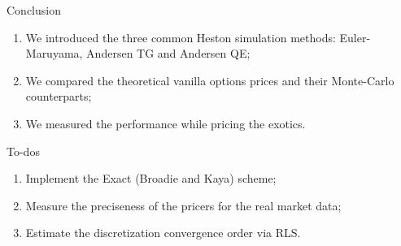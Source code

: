 \begin{frame}{Conclusion}
    \begin{enumerate}
        \item We introduced the three common Heston simulation methods: Euler-Maruyama, Andersen TG and Andersen QE; 
        \item We compared the theoretical vanilla options prices and their Monte-Carlo counterparts;
        \item We measured the performance while pricing the exotics.
    \end{enumerate}
\end{frame}

\begin{frame}{To-dos}
    \begin{enumerate}
        \item Implement the Exact (Broadie and Kaya) scheme;
        \item Measure the preciseness of the pricers for the real market data;
        \item Estimate the discretization convergence order via RLS.
    \end{enumerate}
\end{frame}
